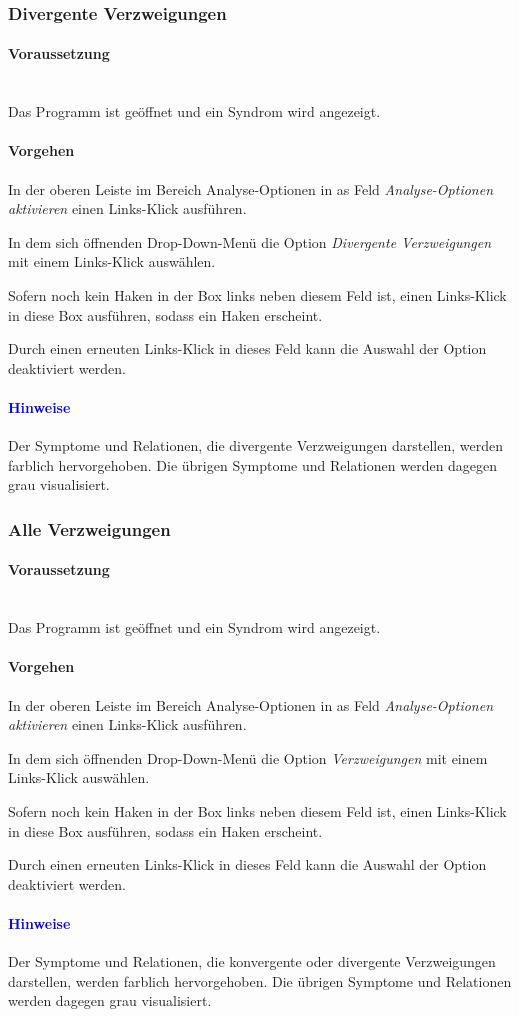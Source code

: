 \documentclass[enabledeprecatedfontcommands,fontsize=11pt,paper=a4,twoside]{scrartcl}
\newcounter{one}
\newcounter{two}[one]
\newcommand*{\hint}{\paragraph{\textcolor{blue}{Hinweise}}}
\newcommand*{\condition}{\paragraph{Voraussetzung}$\;$ \vspace{0.2cm}\\}
\newcommand*{\action}{\paragraph{Vorgehen}}
\let\tempone\itemize
\let\temptwo\enditemize
\renewenvironment{itemize}{\tempone\addtolength{\itemsep}{-10.0pt}}{\temptwo}
\let\origenumerate\enumerate
\let\origendenumerate\endenumerate
\renewenvironment{enumerate}{\origenumerate \addtolength{\itemsep}{-10.0pt}}{\origendenumerate}
\begin{document}
\subsubsection{Divergente Verzweigungen}
	\condition 
	Das Programm ist geöffnet und ein Syndrom wird angezeigt.
	\action
	\begin{enumerate}
		\item In der oberen Leiste im Bereich Analyse-Optionen in as Feld \textit{Analyse-Optionen aktivieren} einen Links-Klick ausführen.
		\item In dem sich öffnenden Drop-Down-Menü die Option \textit{Divergente Verzweigungen} mit einem Links-Klick auswählen. 
		\item Sofern noch kein Haken in der Box links neben diesem Feld ist, einen Links-Klick in diese Box ausführen, sodass ein Haken erscheint.
		\item Durch einen erneuten Links-Klick in dieses Feld kann die Auswahl der Option deaktiviert werden.
	\end{enumerate} 
	\hint
	\begin{itemize}
		\item Der Symptome und Relationen, die divergente Verzweigungen darstellen, werden farblich hervorgehoben. Die übrigen Symptome und Relationen werden dagegen grau visualisiert. \\
	\end{itemize}

\subsubsection{Alle Verzweigungen}
	\condition 
	Das Programm ist geöffnet und ein Syndrom wird angezeigt.
	\action
	\begin{enumerate}
		\item In der oberen Leiste im Bereich Analyse-Optionen in as Feld \textit{Analyse-Optionen aktivieren} einen Links-Klick ausführen.
		\item In dem sich öffnenden Drop-Down-Menü die Option \textit{Verzweigungen} mit einem Links-Klick auswählen. 
		\item Sofern noch kein Haken in der Box links neben diesem Feld ist, einen Links-Klick in diese Box ausführen, sodass ein Haken erscheint.
		\item Durch einen erneuten Links-Klick in dieses Feld kann die Auswahl der Option deaktiviert werden.
	\end{enumerate} 
	\hint
	\begin{itemize}
		\item Der Symptome und Relationen, die konvergente oder divergente Verzweigungen darstellen, werden farblich hervorgehoben. Die übrigen Symptome und Relationen werden dagegen grau visualisiert. \\
	\end{itemize}
\end{document}
